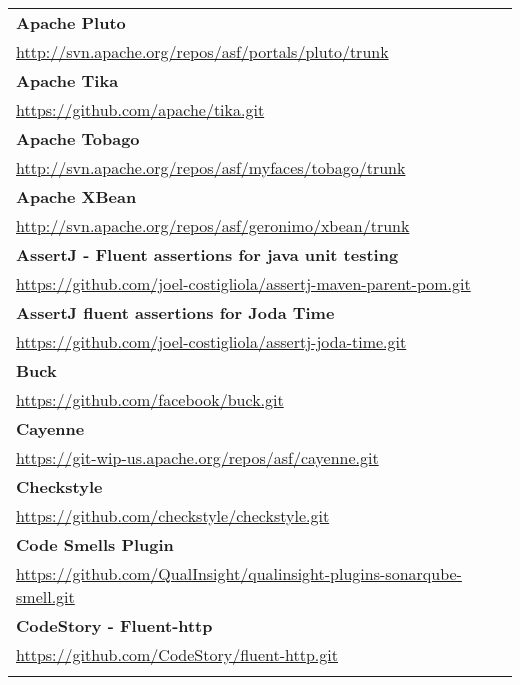 \begin{table}[]
\small
\begin{tabular}{|p{130mm}|}
	
\hline
\bf Apache Pluto                                       \\ \url{http://svn.apache.org/repos/asf/portals/pluto/trunk}                      \\ \hline \bf
Apache Tika                                        \\ \url{https://github.com/apache/tika.git}                                           \\ \hline \bf
Apache Tobago                                      \\ \url{http://svn.apache.org/repos/asf/myfaces/tobago/trunk}                         \\ \hline \bf
Apache XBean                                       \\ \url{http://svn.apache.org/repos/asf/geronimo/xbean/trunk}                         \\ \hline \bf
AssertJ - Fluent assertions for java unit testing  \\ \url{https://github.com/joel-costigliola/assertj-maven-parent-pom.git}             \\ \hline \bf 
AssertJ fluent assertions for Joda Time            \\ \url{https://github.com/joel-costigliola/assertj-joda-time.git}                    \\ \hline \bf
Buck                                               \\ \url{https://github.com/facebook/buck.git}                                         \\ \hline \bf
Cayenne                                            \\ \url{https://git-wip-us.apache.org/repos/asf/cayenne.git}                          \\ \hline \bf
Checkstyle                                         \\ \url{https://github.com/checkstyle/checkstyle.git}                                 \\ \hline \bf
Code Smells Plugin                                 \\ \url{https://github.com/QualInsight/qualinsight-plugins-sonarqube-smell.git}       \\ \hline \bf
CodeStory - Fluent-http                            \\ \url{https://github.com/CodeStory/fluent-http.git}                                 \\ \hline \bf

\end{tabular}
\end{table}
